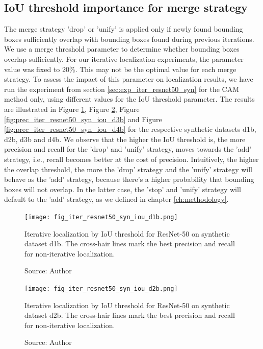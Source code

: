 \subsection{IoU threshold importance for merge strategy}
The merge strategy 'drop' or 'unify' is applied only if newly found bounding boxes sufficiently overlap with bounding boxes found during previous iterations. We use a merge threshold parameter to determine whether bounding boxes overlap sufficiently. For our iterative localization experiments, the parameter value was fixed to 20\%. This may not be the optimal value for each merge strategy. To assess the impact of this parameter on localization results, we have run the experiment from section \ref{sec:exp_iter_resnet50_syn} for the CAM method only, using different values for the IoU threshold parameter. The results are illustrated in Figure \ref{fig:prec_iter_resnet50_syn_iou_d1b}, Figure \ref{fig:prec_iter_resnet50_syn_iou_d2b}, Figure \ref{fig:prec_iter_resnet50_syn_iou_d3b} and Figure \ref{fig:prec_iter_resnet50_syn_iou_d4b} for the respective synthetic datasets d1b, d2b, d3b and d4b. We observe that the higher the IoU threshold is, the more precision and recall for the 'drop' and 'unify' strategy, moves towards the 'add' strategy, i.e., recall becomes better at the cost of precision. Intuitively, the higher the overlap threshold, the more the 'drop' strategy and the 'unify' strategy will behave as the 'add' strategy, because there's a higher probability that bounding boxes will not overlap. In the latter case, the 'stop' and 'unify' strategy will default to the 'add' strategy, as we defined in chapter \ref{ch:methodology}.

\begin{figure}[h]
    \begin{center}       
    \texttt{[image: fig\_iter\_resnet50\_syn\_iou\_d1b.png]}
    \caption[Iterative localization by IoU threshold for ResNet-50 on synthetic dataset d1b]{Iterative localization by IoU threshold for ResNet-50 on synthetic dataset d1b. The cross-hair lines mark the best precision and recall for non-iterative localization.}
    \caption*{Source: Author}
    \label{fig:prec_iter_resnet50_syn_iou_d1b}
    \end{center}
\end{figure}

\begin{figure}[h]
    \begin{center}       
    \texttt{[image: fig\_iter\_resnet50\_syn\_iou\_d2b.png]}
    \caption[Iterative localization by IoU threshold for ResNet-50 on synthetic dataset d2b]{Iterative localization by IoU threshold for ResNet-50 on synthetic dataset d2b. The cross-hair lines mark the best precision and recall for non-iterative localization.}
    \caption*{Source: Author}
    \label{fig:prec_iter_resnet50_syn_iou_d2b}
    \end{center}
\end{figure}

